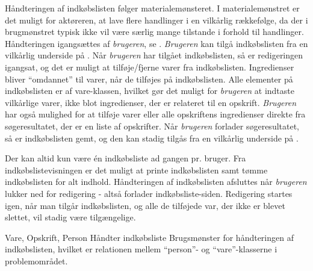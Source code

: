 {Håndteringen af indkøbslisten følger materialemønsteret\cite[p.~128]{ooad}. I materialemønstret er det muligt for aktøreren, at lave flere handlinger i en vilkårlig rækkefølge, da der i brugmønstret typisk ikke vil være særlig mange tilstande i forhold til handlinger. Håndteringen igangsættes af \textit{brugeren}, se . \textit{Brugeren} kan tilgå indkøbslisten fra en vilkårlig underside på \Foodl. Når \textit{brugeren} har tilgået indkøbslisten, så er redigeringen igangsat, og det er muligt at tilføje/fjerne varer fra indkøbslisten. Ingredienser bliver ``omdannet'' til varer, når de tilføjes på indkøbslisten. Alle elementer på indkøbslisten er af vare-klassen, hvilket gør det muligt for \textit{brugeren} at indtaste vilkårlige varer, ikke blot ingredienser, der er relateret til \fx en opskrift. \textit{Brugeren} har også mulighed for at tilføje varer eller alle opskriftens ingredienser direkte fra søgeresultatet, der er en liste af opskrifter. Når \textit{brugeren} forlader søgeresultatet, så er indkøbslisten gemt, og den kan stadig tilgås fra en vilkårlig underside på \Foodl. 

Der kan altid kun være én indkøbsliste ad gangen pr. bruger. Fra indkøbslistevisningen er det muligt at printe indkøbslisten samt tømme indkøbslisten for alt indhold. Håndteringen af indkøbslisten afsluttes når \textit{brugeren} lukker ned for redigering - altså forlader indkøbsliste-siden. Redigering startes igen, når man tilgår indkøbslisten, og alle de tilføjede var, der ikke er blevet slettet, vil stadig være tilgængelige.}
{Vare, Opskrift, Person}
{Håndter indkøbsliste}
{Brugsmønster for håndteringen af indkøbslisten, hvilket er relationen mellem ``person''- og ``vare''-klasserne i problemområdet.}
